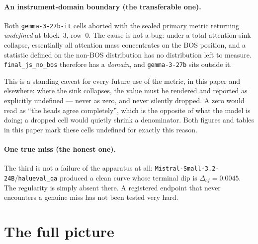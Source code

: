 \documentclass[10pt, letterpaper]{article}
\begin{document}
\paragraph{An instrument-domain boundary (the transferable one).} Both
\texttt{gemma-3-27b-it} cells aborted with the sealed primary metric returning
\emph{undefined} at block~$3$, row~$0$. The cause is not a bug: under a total
attention-sink collapse, essentially all attention mass concentrates on the BOS
position, and a statistic defined on the non-BOS distribution has no distribution
left to measure. \texttt{final\_js\_no\_bos} therefore has a \emph{domain}, and
\texttt{gemma-3-27b} sits outside it.

This is a standing caveat for every future use of the metric, in this paper and
elsewhere: where the sink collapses, the value must be rendered and reported as
explicitly undefined --- never as zero, and never silently dropped. A zero would
read as ``the heads agree completely'', which is the opposite of what the model
is doing; a dropped cell would quietly shrink a denominator. Both figures and
tables in this paper mark these cells undefined for exactly this reason.

\paragraph{One true miss (the honest one).} The third is not a failure of the
apparatus at all: \texttt{Mistral-Small-3.2-24B}/\texttt{halueval\_qa} produced a
clean curve whose terminal dip is $\Delta_{cf}=0.0045$. The regularity is simply
absent there. A registered endpoint that never encounters a genuine miss has not
been tested very hard.

\section{The full picture}
\label{sec:grid}
\end{document}
